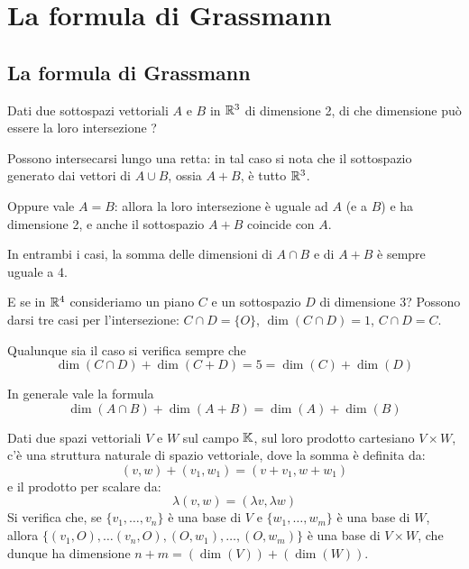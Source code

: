 \chapter{La formula di Grassmann}
\section{La formula di Grassmann}

Dati due sottospazi vettoriali $A$ e $B$ in $\mathbb{R}^3$ di dimensione 2,
di che dimensione può essere la loro intersezione ?

Possono intersecarsi lungo una retta: in tal caso si nota che il sottospazio
generato dai vettori di $A \cup B$, ossia $A + B$, è tutto $\mathbb{R}^3$.

Oppure vale $A = B$: allora la loro intersezione è uguale ad $A$ (e a $B$) e
ha dimensione 2, e anche il sottospazio $A + B$ coincide con $A$.

In entrambi i casi, la somma delle dimensioni di $A \cap B$ e di $A + B$ è
sempre uguale a 4.

E se in $\mathbb{R}^4$ consideriamo un piano $C$ e un sottospazio $D$ di
dimensione 3?
Possono darsi tre casi per l'intersezione: $C \cap D = \{O\}$,
$\dim(C \cap D) = 1$, $C \cap D = C$.

Qualunque sia il caso si verifica sempre che
\[
	\dim(C \cap D) + \dim(C + D) = 5 = \dim(C) + \dim(D)
\]

In generale vale la formula
\[
	\dim(A \cap B) + \dim(A + B) = \dim(A) + \dim(B)
\]

Dati due spazi vettoriali $V$ e $W$ sul campo $\mathbb{K}$, sul loro prodotto
cartesiano $V \times W$, c'è una struttura naturale di spazio vettoriale, dove
la somma è definita da:
\[
	(v, w) + (v_1, w_1) = (v + v_1, w + w_1)
\]
e il prodotto per scalare da:
\[
	\lambda(v, w) = (\lambda v, \lambda w)
\]
Si verifica che, se $\{v_1, \dots, v_n\}$ è una base di $V$
e $\{w_1, \dots, w_m\}$ è una base di $W$, allora
$\{(v_1, O), \dots (v_n, O), (O, w_1), \dots, (O, w_m)\}$ è una base di
$V \times W$, che dunque ha dimensione $n + m = (\dim(V)) + (\dim(W))$.

